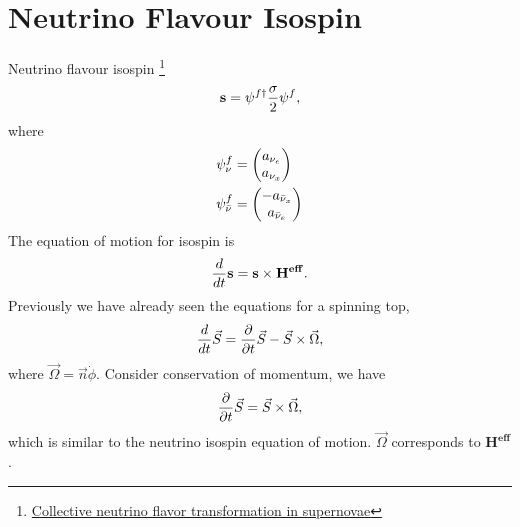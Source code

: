 \documentclass[letterpaper,12pt,english]{sphinxmanual}
\begin{document}
\section{Neutrino Flavour Isospin}
\label{picture:neutrino-flavour-isospin}
Neutrino flavour isospin \footnote{
\href{http://journals.aps.org/prd/abstract/10.1103/PhysRevD.74.123004}{Collective neutrino flavor transformation in supernovae}
}
\begin{gather}
\begin{split}\mathbf s = \psi^{f\dagger} \frac{\mathbf\sigma}{2} \psi^f,\end{split}\notag
\end{gather}
where
\begin{gather}
\begin{split}\psi^f_\nu & = \begin{pmatrix} a_{\nu_e} \\ a_{\nu_x} \end{pmatrix} \\
\psi^f_{\bar \nu} & = \begin{pmatrix} - a_{\bar\nu_x} \\ a_{\bar\nu_e} \end{pmatrix}\end{split}\notag
\end{gather}
The equation of motion for isospin is
\begin{gather}
\begin{split}\frac{d}{dt}\mathbf s = \mathbf s \times \mathbf {H^{eff}}.\end{split}\notag
\end{gather}
Previously we have already seen the equations for a spinning top,
\begin{gather}
\begin{split}\frac{d}{dt}\vec S  =  \frac{\partial}{\partial t} \vec S  - \vec S \times \vec \Omega,\end{split}\notag
\end{gather}
where \(\vec\Omega = \vec n \dot\phi\). Consider conservation of momentum, we have
\begin{gather}
\begin{split}\frac{\partial}{\partial t} \vec S  = \vec S \times \vec \Omega,\end{split}\notag
\end{gather}
which is similar to the neutrino isospin equation of motion. \(\vec \Omega\) corresponds to \(\mathbf {H^{eff}}\).
\end{document}
